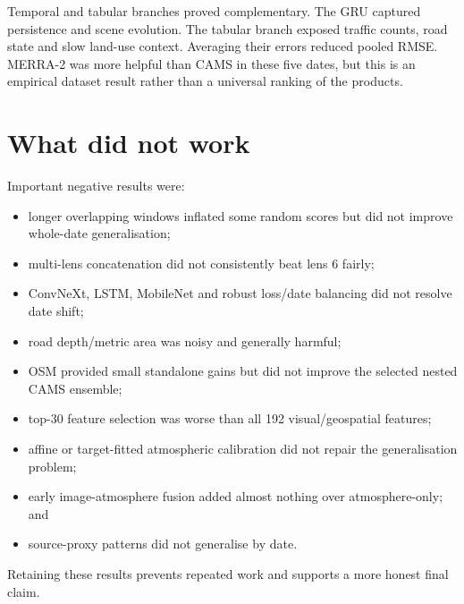 \documentclass[11pt,a4paper,oneside]{report}
\begin{document}
Temporal and tabular branches proved complementary. The GRU captured persistence
and scene evolution. The tabular branch exposed traffic counts, road state and
slow land-use context. Averaging their errors reduced pooled RMSE. MERRA-2 was
more helpful than CAMS in these five dates, but this is an empirical dataset
result rather than a universal ranking of the products.

\section{What did not work}
Important negative results were:
\begin{itemize}
  \item longer overlapping windows inflated some random scores but did not
        improve whole-date generalisation;
  \item multi-lens concatenation did not consistently beat lens 6 fairly;
  \item ConvNeXt, LSTM, MobileNet and robust loss/date balancing did not resolve
        date shift;
  \item road depth/metric area was noisy and generally harmful;
  \item OSM provided small standalone gains but did not improve the selected
        nested CAMS ensemble;
  \item top-30 feature selection was worse than all 192 visual/geospatial
        features;
  \item affine or target-fitted atmospheric calibration did not repair the
        generalisation problem;
  \item early image-atmosphere fusion added almost nothing over atmosphere-only;
        and
  \item source-proxy patterns did not generalise by date.
\end{itemize}
Retaining these results prevents repeated work and supports a more honest final
claim.
\end{document}
